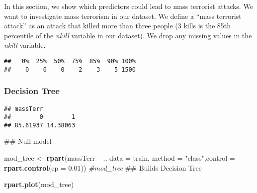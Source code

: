 \documentclass[11pt,letterpaper,]{article}
\newenvironment{Shaded}{\begin{snugshade}}{\end{snugshade}}
\newcommand{\KeywordTok}[1]{\textcolor[rgb]{0.13,0.29,0.53}{\textbf{{#1}}}}
\newcommand{\DataTypeTok}[1]{\textcolor[rgb]{0.13,0.29,0.53}{{#1}}}
\newcommand{\FloatTok}[1]{\textcolor[rgb]{0.00,0.00,0.81}{{#1}}}
\newcommand{\StringTok}[1]{\textcolor[rgb]{0.31,0.60,0.02}{{#1}}}
\newcommand{\CommentTok}[1]{\textcolor[rgb]{0.56,0.35,0.01}{\textit{{#1}}}}
\newcommand{\NormalTok}[1]{{#1}}
\theoremstyle{definition}
\theoremstyle{definition}
\theoremstyle{definition}
\theoremstyle{remark}
\begin{document}
In this section, we show which predictors could lead to mass terrorist
attacks. We want to investigate mass terrorism in our dataset. We define
a ``mass terrorist attack'' as an attack that killed more than three
people (3 kills is the 85th percentile of the \emph{nkill} variable in
our dataset). We drop any missing values in the \emph{nkill} variable.

\begin{verbatim}
##   0%  25%  50%  75%  85%  90% 100% 
##    0    0    0    2    3    5 1500
\end{verbatim}

\subsubsection{Decision Tree}\label{decision-tree}

\begin{Shaded}
\end{Shaded}

\begin{verbatim}
## massTerr
##        0        1 
## 85.61937 14.38063
\end{verbatim}

\begin{Shaded}
\begin{Highlighting}[]
\NormalTok{## Null model}

   
\NormalTok{mod_tree <-}\StringTok{ }\KeywordTok{rpart}\NormalTok{(massTerr ~}\StringTok{ }\NormalTok{., }\DataTypeTok{data =} \NormalTok{train, }\DataTypeTok{method =} \StringTok{"class"}\NormalTok{,}\DataTypeTok{control =} \KeywordTok{rpart.control}\NormalTok{(}\DataTypeTok{cp =} \FloatTok{0.01}\NormalTok{))}
\CommentTok{#mod_tree}
\NormalTok{## Builds Decision Tree }
\end{Highlighting}
\end{Shaded}



\begin{Shaded}
\begin{Highlighting}[]
\KeywordTok{rpart.plot}\NormalTok{(mod_tree)}
\end{Highlighting}
\end{Shaded}
\end{document}
